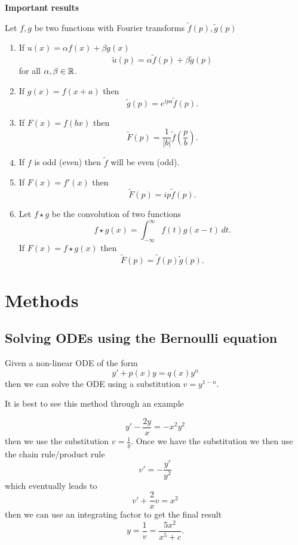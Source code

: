 \documentclass[10pt, a4paper]{article}
\begin{document}
\textbf{Important results}

Let $f, g$ be two functions with Fourier transforms $\tilde{f}(p), \tilde{g}(p)$
\begin{enumerate}[label = (\roman*)]
    \item
    If $u(x) = \alpha f(x) + \beta g(x)$
    \[
    \tilde{u}(p) = \alpha\tilde{f}(p) + \beta\tilde{g}(p)
    \]
    for all $\alpha, \beta \in \mathbb{R}$.

    \item
    If $g(x) = f(x + a)$ then
    \[
    \tilde{g}(p) = e ^ {ipa}\tilde{f}(p).
    \]

    \item
    If $F(x) = f(bx)$ then
    \[
    \tilde{F}(p) = \frac{1}{|b|}\tilde{f}\left(\frac{p}{b}\right).
    \]

    \item
    If $f$ is odd
    (even)
    then $\tilde{f}$ will be even
    (odd).

    \item
    If $F(x) = f'(x)$ then
    \[
    \tilde{F}(p) = ip\tilde{f}(p).
    \]

    \item
    Let $f \star g$ be the convolution of two functions
    \[
    f \star g(x) = \int_{-\infty}^{\infty}f(t)g(x - t)\,dt.
    \]
    If $F(x) = f \star g(x)$ then
    \[
    \tilde{F}(p) = \tilde{f}(p)\tilde{g}(p).
    \]
\end{enumerate}

\newpage

\section{Methods}

\subsection{Solving ODEs using the Bernoulli equation}
Given a non-linear ODE of the form
\[
y' + p(x)y = q(x)y ^ n
\]
then we can solve the ODE using a substitution $v = y ^ {1 - n}$.

It is best to see this method through an example
\begin{example}
    \[
    y' - \frac{2y}{x} = -x ^ 2y ^ 2
    \]
    then we use the substitution $v = \frac{1}{y}$.
    Once we have the substitution we then use the chain rule/product rule
    \[
    v' = -\frac{y'}{y ^ 2}
    \]
    which eventually leads to
    \[
    v' + \frac{2}{x}v = x ^ 2
    \]
    then we can use an integrating factor to get the final result
    \[
    y = \frac{1}{v} = \frac{5x ^ 2}{x ^ 5 + c}.
    \]
\end{example}
\end{document}
